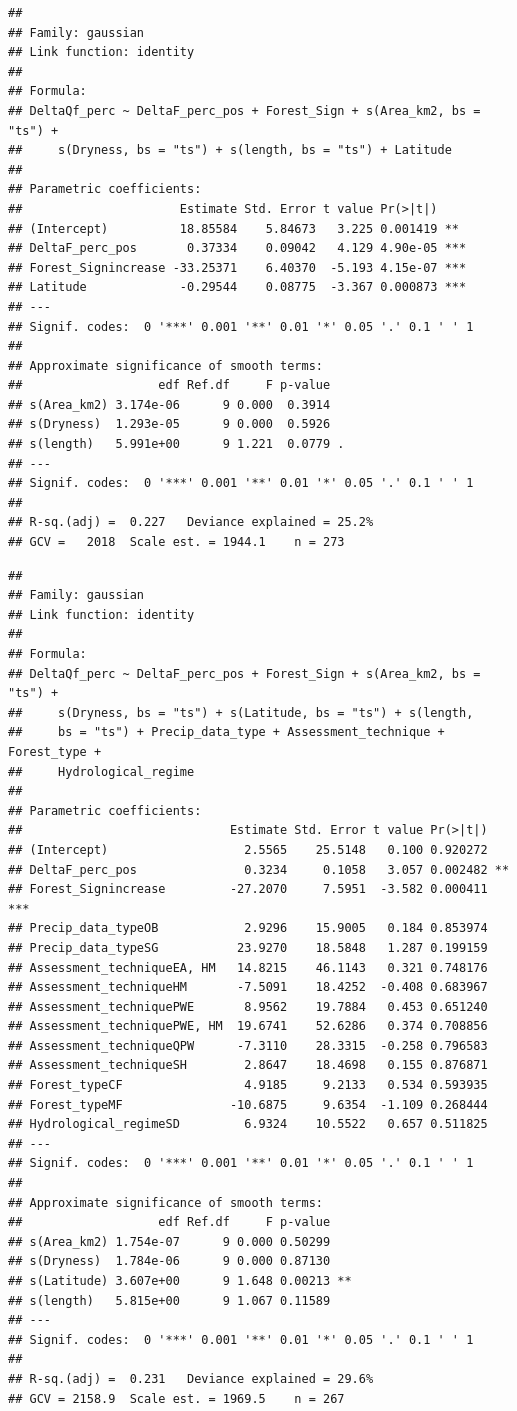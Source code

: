 \documentclass[]{elsarticle} %
\begin{document}
\begin{verbatim}
## 
## Family: gaussian 
## Link function: identity 
## 
## Formula:
## DeltaQf_perc ~ DeltaF_perc_pos + Forest_Sign + s(Area_km2, bs = "ts") + 
##     s(Dryness, bs = "ts") + s(length, bs = "ts") + Latitude
## 
## Parametric coefficients:
##                      Estimate Std. Error t value Pr(>|t|)    
## (Intercept)          18.85584    5.84673   3.225 0.001419 ** 
## DeltaF_perc_pos       0.37334    0.09042   4.129 4.90e-05 ***
## Forest_Signincrease -33.25371    6.40370  -5.193 4.15e-07 ***
## Latitude             -0.29544    0.08775  -3.367 0.000873 ***
## ---
## Signif. codes:  0 '***' 0.001 '**' 0.01 '*' 0.05 '.' 0.1 ' ' 1
## 
## Approximate significance of smooth terms:
##                   edf Ref.df     F p-value  
## s(Area_km2) 3.174e-06      9 0.000  0.3914  
## s(Dryness)  1.293e-05      9 0.000  0.5926  
## s(length)   5.991e+00      9 1.221  0.0779 .
## ---
## Signif. codes:  0 '***' 0.001 '**' 0.01 '*' 0.05 '.' 0.1 ' ' 1
## 
## R-sq.(adj) =  0.227   Deviance explained = 25.2%
## GCV =   2018  Scale est. = 1944.1    n = 273
\end{verbatim}

\begin{verbatim}
## 
## Family: gaussian 
## Link function: identity 
## 
## Formula:
## DeltaQf_perc ~ DeltaF_perc_pos + Forest_Sign + s(Area_km2, bs = "ts") + 
##     s(Dryness, bs = "ts") + s(Latitude, bs = "ts") + s(length, 
##     bs = "ts") + Precip_data_type + Assessment_technique + Forest_type + 
##     Hydrological_regime
## 
## Parametric coefficients:
##                             Estimate Std. Error t value Pr(>|t|)    
## (Intercept)                   2.5565    25.5148   0.100 0.920272    
## DeltaF_perc_pos               0.3234     0.1058   3.057 0.002482 ** 
## Forest_Signincrease         -27.2070     7.5951  -3.582 0.000411 ***
## Precip_data_typeOB            2.9296    15.9005   0.184 0.853974    
## Precip_data_typeSG           23.9270    18.5848   1.287 0.199159    
## Assessment_techniqueEA, HM   14.8215    46.1143   0.321 0.748176    
## Assessment_techniqueHM       -7.5091    18.4252  -0.408 0.683967    
## Assessment_techniquePWE       8.9562    19.7884   0.453 0.651240    
## Assessment_techniquePWE, HM  19.6741    52.6286   0.374 0.708856    
## Assessment_techniqueQPW      -7.3110    28.3315  -0.258 0.796583    
## Assessment_techniqueSH        2.8647    18.4698   0.155 0.876871    
## Forest_typeCF                 4.9185     9.2133   0.534 0.593935    
## Forest_typeMF               -10.6875     9.6354  -1.109 0.268444    
## Hydrological_regimeSD         6.9324    10.5522   0.657 0.511825    
## ---
## Signif. codes:  0 '***' 0.001 '**' 0.01 '*' 0.05 '.' 0.1 ' ' 1
## 
## Approximate significance of smooth terms:
##                   edf Ref.df     F p-value   
## s(Area_km2) 1.754e-07      9 0.000 0.50299   
## s(Dryness)  1.784e-06      9 0.000 0.87130   
## s(Latitude) 3.607e+00      9 1.648 0.00213 **
## s(length)   5.815e+00      9 1.067 0.11589   
## ---
## Signif. codes:  0 '***' 0.001 '**' 0.01 '*' 0.05 '.' 0.1 ' ' 1
## 
## R-sq.(adj) =  0.231   Deviance explained = 29.6%
## GCV = 2158.9  Scale est. = 1969.5    n = 267
\end{verbatim}
\end{document}
